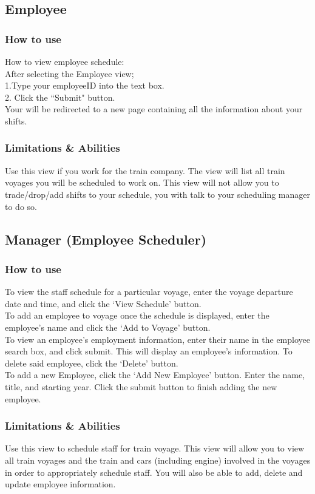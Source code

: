 \documentclass[letter]{article}
\begin{document}
\subsection{Employee}
\subsubsection{How to use}
How to view employee schedule:\\
After selecting the Employee view;\\ 
1.Type your employeeID into the text box.\\
2. Click the ``Submit" button. \\
Your will be redirected to a new page containing all the information about your shifts. \\
\subsubsection{Limitations \& Abilities}
Use this view if you work for the train company. The view will list all train voyages you will be scheduled to work on.  This view will not allow you to trade/drop/add shifts to your schedule, you with talk to your scheduling manager  to do so.


\subsection{Manager (Employee Scheduler)}
\subsubsection{How to use}
To view the staff schedule for a particular voyage, enter the voyage departure date and time, and click the `View Schedule' button. \\
To add an employee to voyage once the schedule is displayed, enter the employee's name and click the `Add to Voyage' button. \\
To view an employee's employment information, enter their name in the employee search box, and click submit. This will display an employee's information. To delete said employee, click the `Delete' button. \\
To add a new Employee, click the `Add New Employee' button. Enter the name, title, and starting year. Click the submit button to finish adding the new employee.
\subsubsection{Limitations \& Abilities}
Use this view to schedule staff for train voyage. This view will allow you to view all train voyages and the train and cars (including engine) involved in the voyages in order to appropriately schedule staff. You will also be able to add, delete and update employee information.
\end{document}

